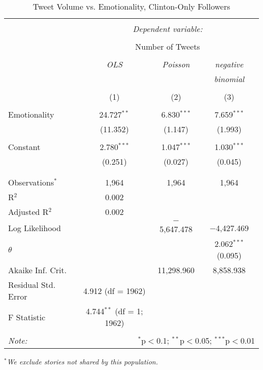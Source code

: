 \begin{table}[!htbp] \centering 
  \caption{Tweet Volume vs. Emotionality, Clinton-Only Followers} 
  \label{} 
    \begin{tabular}{@{\extracolsep{5pt}}lccc} 
    \\[-1.8ex]\hline 
    \hline \\[-1.8ex] 
     & \multicolumn{3}{c}{\textit{Dependent variable:}} \\ 
    \cline{2-4} 
    \\[-1.8ex] & \multicolumn{3}{c}{Number of Tweets} \\ 
    \\[-1.8ex] & \textit{OLS} & \textit{Poisson} & \textit{negative} \\ 
     & \textit{} & \textit{} & \textit{binomial} \\ 
    \\[-1.8ex] & (1) & (2) & (3)\\ 
    \hline \\[-1.8ex] 
     Emotionality & 24.727$^{**}$ & 6.830$^{***}$ & 7.659$^{***}$ \\ 
      & (11.352) & (1.147) & (1.993) \\ 
      & & & \\ 
     Constant & 2.780$^{***}$ & 1.047$^{***}$ & 1.030$^{***}$ \\ 
      & (0.251) & (0.027) & (0.045) \\ 
      & & & \\ 
    \hline \\[-1.8ex] 
    Observations$^{*}$ & 1,964 & 1,964 & 1,964 \\ 
    R$^{2}$ & 0.002 &  &  \\ 
    Adjusted R$^{2}$ & 0.002 &  &  \\ 
    Log Likelihood &  & $-$5,647.478 & $-$4,427.469 \\ 
    $\theta$ &  &  & 2.062$^{***}$  (0.095) \\ 
    Akaike Inf. Crit. &  & 11,298.960 & 8,858.938 \\ 
    Residual Std. Error & 4.912 (df = 1962) &  &  \\ 
    F Statistic & 4.744$^{**}$ (df = 1; 1962) &  &  \\ 
    \hline 
    \hline \\[-1.8ex] 
    \textit{Note:}  & \multicolumn{3}{r}{$^{*}$p$<$0.1; $^{**}$p$<$0.05; $^{***}$p$<$0.01} \\ 
    \end{tabular} 
\end{table} 
\emph{$^{*}$We exclude stories not shared by this population.} 
\newpage 

